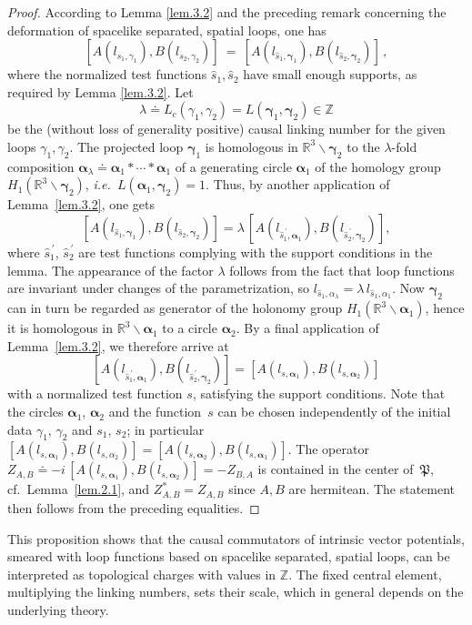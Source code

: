 \documentclass[11pt]{article}
\numberwithin{equation}{section}
\newcommand{\RR}{{\mathbb R}}
\newcommand{\ZZ}{{\mathbb Z}}
\newcommand{\balpha}{{\bm \alpha}}
\newcommand{\bgamma}{{\bm \gamma}}
\newcommand{\fP}{{\mathfrak P}}
\def\ie{{\it i.e.\ }}
\begin{document}
\begin{proof}
According to Lemma \ref{lem.3.2} and the preceding 
remark concerning the deformation of spacelike separated,
spatial loops, one has 
$$ [ A(l_{s_1,\gamma_1}) , B(l_{s_2,\gamma_2}) ] 
\ = \ [ A(l_{\widehat s_1,\bgamma_1}) , B(l_{\widehat s_2,\bgamma_2}) ] \, ,
$$
where the normalized test functions $\widehat s_1, \widehat s_2$ 
have small enough supports, as required by Lemma \ref{lem.3.2}. Let 
$$
\lambda \doteq L_c(\gamma_1,\gamma_2) = 
L(\bgamma_1, \bgamma_2) \in \ZZ 
$$ 
be the (without loss of generality positive) 
causal linking number for the given 
loops $ \gamma _1,  \gamma _2$. The
projected loop $\bgamma_1$ is homologous in 
$\RR^3 \backslash \bgamma_2$ to the 
$\lambda$-fold composition $\balpha_\lambda  
\doteq \balpha_1*\cdots* \balpha_1$ 
of a generating circle 
$\balpha_1$ of the homology group $H_1(\RR^3 \backslash \bgamma_2)$,  
\ie $L(\balpha_1, \bgamma_2) = 1$. 
Thus, by another application of Lemma~\ref{lem.3.2}, one gets  
$$
 [ A(l_{\widehat s_1, \bgamma_1}) , B(l_{\widehat s_2,\bgamma_2}) ] 
= \lambda \, [ A(l_{{\widehat s}^{\, \prime}_1, \balpha_1}) , 
B(l_{{\widehat s}^{\, \prime}_2,\bgamma_2})] ,
$$
where ${\widehat s}^{\, \prime}_1$, ${\widehat s}^{\, \prime}_2$
are test functions
complying with the support conditions in the lemma.
The appearance of the factor $\lambda$ follows from the fact 
that loop functions are invariant under changes of the parametrization, 
so \mbox{$l_{\widehat s_1,\alpha_\lambda} = \lambda \, l_{\widehat s_1,\alpha_1}$}. 
Now $\bgamma_2$ can in turn be regarded as generator of 
the holonomy group $H_1(\RR^3 \backslash \balpha_1)$, hence it 
is homologous in  $\RR^3 \backslash \balpha_1$
to a circle $\balpha_2$. By a final application of 
Lemma~\ref{lem.3.2}, we therefore arrive at 
$$
[ A(l_{{\widehat s}^{\, \prime}_1, \balpha_1}) , 
B(l_{{\widehat s}^{\, \prime}_2, \bgamma_2})]
= [ A(l_{s , \balpha_1}) , 
B(l_{s ,\balpha_2})] 
$$
with a normalized test function $s$, 
satisfying the support conditions. 
Note that the circles $\balpha_1$, $\balpha_2$   
and the function~$s$ can be chosen independently of 
the initial data $\gamma_1$, $\gamma_2$ and $s_1$, $s_2$; in particular 
$[ A(l_{s, \balpha_1}) , B(l_{s, \alpha_2})] = [ A(l_{s, \balpha_2}) , B(l_{s, \balpha_1})]$.
The operator 
$Z_{A,B} \doteq -i \, [ A(l_{s , \balpha_1}) , B(l_{s ,\balpha_2})] 
= - Z_{B,A}$ is contained in the center
of~$\fP$, cf.\ Lemma~\ref{lem.2.1}, and 
$Z_{A,B}^* = Z_{A,B}$ since $A,B$ are hermitean.
The statement then follows from the preceding equalities. 
\end{proof}
%
This proposition shows that the causal commutators of intrinsic
vector potentials, smeared with loop functions based on 
spacelike separated, spatial loops, 
can be interpreted as topological charges with values
in $\ZZ$. The fixed central element, multiplying the 
linking numbers, sets their scale, which in general depends on
the underlying theory.
\end{document}
